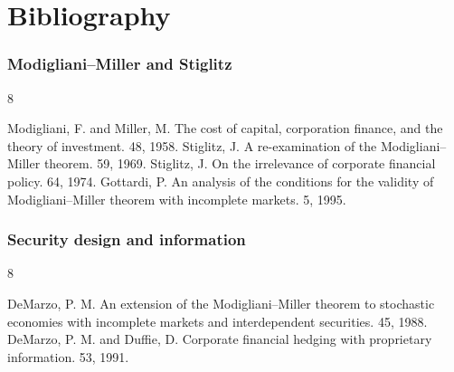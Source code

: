 \documentclass[blue]{beamer}
\theoremstyle{definition}
\theoremstyle{example}
\begin{document}
\section{Bibliography}

\begin{frame}\frametitle{Modigliani--Miller and Stiglitz}
\begin{thebibliography}{8}
\begin{small}
\beamertemplatearticlebibitems
    Modigliani, F. and Miller, M.
    \newblock The cost of capital, corporation finance, and the theory of investment.
     48, 1958.
    Stiglitz, J.
    \newblock A re-examination of the Modigliani--Miller theorem.
     59, 1969.
    Stiglitz, J.
    \newblock On the irrelevance of corporate financial policy.
     64, 1974.
    Gottardi, P.
    \newblock An analysis of the conditions for the validity of Modigliani--Miller theorem with incomplete markets.
     5, 1995.
\end{small}
\end{thebibliography}
\end{frame}

\begin{frame}\frametitle{Security design and information}
\begin{thebibliography}{8}
\begin{small}
\beamertemplatearticlebibitems
    DeMarzo, P. M.
    \newblock An extension of the Modigliani--Miller theorem to stochastic economies with incomplete markets and interdependent securities.
     45, 1988.
    DeMarzo, P. M. and Duffie, D.
    \newblock Corporate financial hedging with proprietary information.
     53, 1991.
\end{small}
\end{thebibliography}
\end{frame}
\end{document}
